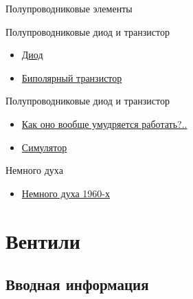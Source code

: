 \documentclass[xetex,aspectratio=43]{beamer}
\begin{document}
\begin{frame}{Полупроводниковые элементы}

\begin{block}{Полупроводниковые диод и транзистор}
\begin{itemize}
\item
  \href{https://en.wikipedia.org/wiki/Diode}{Диод}
\item
  \href{https://en.wikipedia.org/wiki/Bipolar_junction_transistor}{Биполярный
  транзистор}
\end{itemize}
\end{block}

\pause

\begin{block}{Полупроводниковые диод и транзистор}
    \begin{itemize}
  \item \href{https://youtu.be/OMGdSCaMVD0?t=107}{Как оно вообще умудряется работать?..}
  \item \href{https://www.falstad.com/circuit/e-npn.html}{Симулятор}
    \end{itemize}
\end{block}

\pause

\begin{block}{Немного духа}
    \begin{itemize}
        \item \href{https://youtu.be/DEewNHWgqFU}{Немного духа 1960-х}
    \end{itemize}
\end{block}
\end{frame}

\section{Вентили}

\subsection{Вводная информация}
\end{document}
